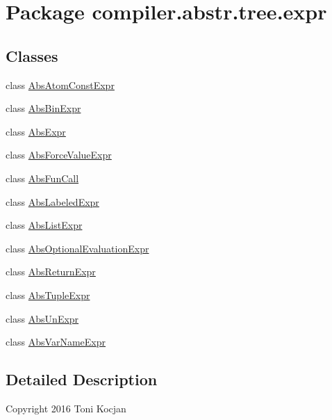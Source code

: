 \hypertarget{namespacecompiler_1_1abstr_1_1tree_1_1expr}{}\section{Package compiler.\+abstr.\+tree.\+expr}
\label{namespacecompiler_1_1abstr_1_1tree_1_1expr}
\subsection*{Classes}
\begin{DoxyCompactItemize}
\item 
class \hyperlink{classcompiler_1_1abstr_1_1tree_1_1expr_1_1_abs_atom_const_expr}{Abs\+Atom\+Const\+Expr}
\item 
class \hyperlink{classcompiler_1_1abstr_1_1tree_1_1expr_1_1_abs_bin_expr}{Abs\+Bin\+Expr}
\item 
class \hyperlink{classcompiler_1_1abstr_1_1tree_1_1expr_1_1_abs_expr}{Abs\+Expr}
\item 
class \hyperlink{classcompiler_1_1abstr_1_1tree_1_1expr_1_1_abs_force_value_expr}{Abs\+Force\+Value\+Expr}
\item 
class \hyperlink{classcompiler_1_1abstr_1_1tree_1_1expr_1_1_abs_fun_call}{Abs\+Fun\+Call}
\item 
class \hyperlink{classcompiler_1_1abstr_1_1tree_1_1expr_1_1_abs_labeled_expr}{Abs\+Labeled\+Expr}
\item 
class \hyperlink{classcompiler_1_1abstr_1_1tree_1_1expr_1_1_abs_list_expr}{Abs\+List\+Expr}
\item 
class \hyperlink{classcompiler_1_1abstr_1_1tree_1_1expr_1_1_abs_optional_evaluation_expr}{Abs\+Optional\+Evaluation\+Expr}
\item 
class \hyperlink{classcompiler_1_1abstr_1_1tree_1_1expr_1_1_abs_return_expr}{Abs\+Return\+Expr}
\item 
class \hyperlink{classcompiler_1_1abstr_1_1tree_1_1expr_1_1_abs_tuple_expr}{Abs\+Tuple\+Expr}
\item 
class \hyperlink{classcompiler_1_1abstr_1_1tree_1_1expr_1_1_abs_un_expr}{Abs\+Un\+Expr}
\item 
class \hyperlink{classcompiler_1_1abstr_1_1tree_1_1expr_1_1_abs_var_name_expr}{Abs\+Var\+Name\+Expr}
\end{DoxyCompactItemize}


\subsection{Detailed Description}
Copyright 2016 Toni Kocjan

